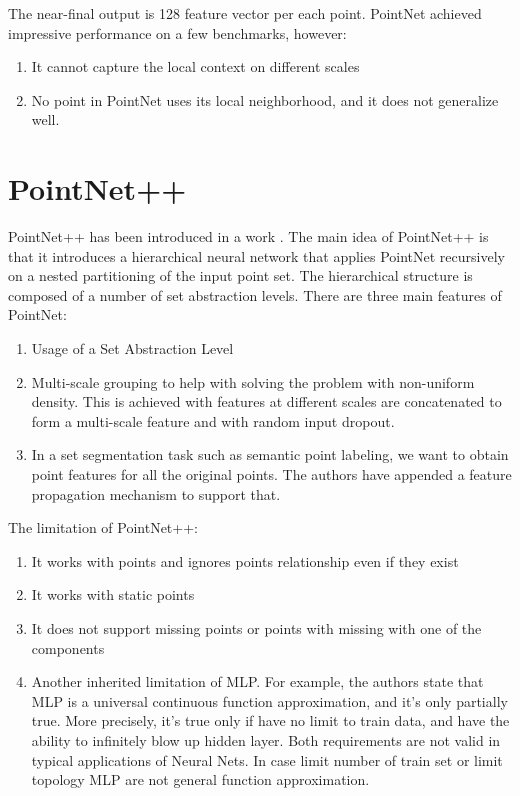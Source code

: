 \documentclass[12pt,a4paper]{article}
\theoremstyle{plain}
\begin{document}
The near-final output is 128 feature vector per each point. PointNet achieved impressive performance on a few benchmarks, however:
\begin{enumerate}
	\item It cannot capture the local context on different scales
	\item No point in PointNet uses its local neighborhood, and it does not generalize well.
\end{enumerate}

\section{PointNet++}
PointNet++ has been introduced in a work \cite{qi2017pointnet++}. The main idea of PointNet++ is that it introduces a hierarchical neural network that applies PointNet recursively on a nested partitioning of the input point set. The hierarchical structure is composed of a number of set abstraction levels. There are three main features of PointNet:
\begin{enumerate}
	\item Usage of a Set Abstraction Level
	\item Multi-scale grouping to help with solving the problem with non-uniform density. This is achieved with features at different scales are concatenated to form a multi-scale feature and with random input dropout.
	\item In a set segmentation task such as semantic point labeling, we want to obtain point features for all the original points. The authors have appended a feature propagation mechanism to support that.
\end{enumerate}

The limitation of PointNet++:
\begin{enumerate}
	\item It works with points and ignores points relationship even if they exist
	\item It works with static points
	\item It does not support missing points or points with missing with one of the components
	\item Another inherited limitation of MLP. For example, the authors state that MLP is a universal continuous function approximation, and it's only partially true. More precisely, it's true only if have no limit to train data, and have the ability to infinitely blow up hidden layer. Both requirements are not valid in typical applications of Neural Nets. In case limit number of train set or limit topology MLP are not general function approximation.
\end{enumerate}
\end{document}
